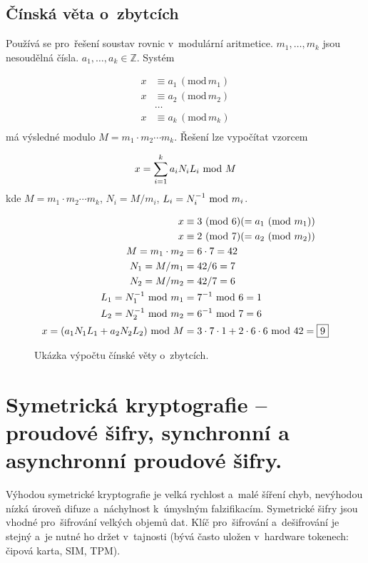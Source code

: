 \clearpage
\subsection{Čínská věta o~zbytcích}

Používá se pro~řešení soustav rovnic v~modulární aritmetice. $m_1, \dots, m_k$ jsou nesoudělná čísla. $a_1, \dots, a_k \in \mathbb{Z}$. Systém

\begin{align*}
x &\equiv a_1 \,(\mathrm{mod}\, m_1) \\
x &\equiv a_2 \,(\mathrm{mod}\, m_2) \\
&\dots \\
x &\equiv a_k \,(\mathrm{mod}\, m_k) \\
\end{align*} %
má výsledné modulo $M = m_1 \cdot m_2 \cdots m_k$. Řešení lze vypočítat vzorcem

$$ x = \sum_{i=1}^{k} a_i N_i L_i \ \mathrm{mod}\ M $$
kde $M = m_1 \cdot m_2 \cdots m_k$, $N_i = M / m_i$, $L_i = N_i^{-1} \ \mathrm{mod}\ m_i$.

\begin{figure}[ht]
\centering
\begin{align*}
x &\equiv 3 \ (\mathrm{mod}\ 6) (= a_1 \ (\mathrm{mod}\ m_1)) \\
x &\equiv 2 \ (\mathrm{mod}\ 7) (= a_2 \ (\mathrm{mod}\ m_2)) \\
M = m_1 \cdot m_2 &= 6 \cdot 7 = 42 \\
N_1 = M / m_1 &= 42 / 6 = 7 \\
N_2 = M / m_2 &= 42 / 7 = 6 \\
L_1 = N_1^{-1} \ \mathrm{mod}\ m_1 &= 7^{-1} \ \mathrm{mod}\ 6 = 1 \\
L_2 = N_2^{-1} \ \mathrm{mod}\ m_2 &= 6^{-1} \ \mathrm{mod}\ 7 = 6 \\
x = (a_1 N_1 L_1 + a_2 N_2 L_2) \ \mathrm{mod}\ M &= 3 \cdot 7 \cdot 1 + 2 \cdot 6 \cdot 6 \ \mathrm{mod}\ 42 = \boxed{9} \\
\end{align*}
\vspace*{-4em}
\caption*{Ukázka výpočtu čínské věty o~zbytcích.}
\end{figure}

\clearpage
\section{Symetrická kryptografie -- proudové šifry, synchronní a asynchronní proudové šifry.}
\label{question-4}

Výhodou symetrické kryptografie je velká rychlost a~malé šíření chyb, nevýhodou nízká úroveň difuze a~náchylnost k~úmyslným falzifikacím. Symetrické šifry jsou vhodné pro~šifrování velkých objemů dat. Klíč pro~šifrování a~dešifrování je stejný a~je nutné ho držet v~tajnosti (bývá často uložen v~hardware tokenech: čipová karta, SIM, TPM).


